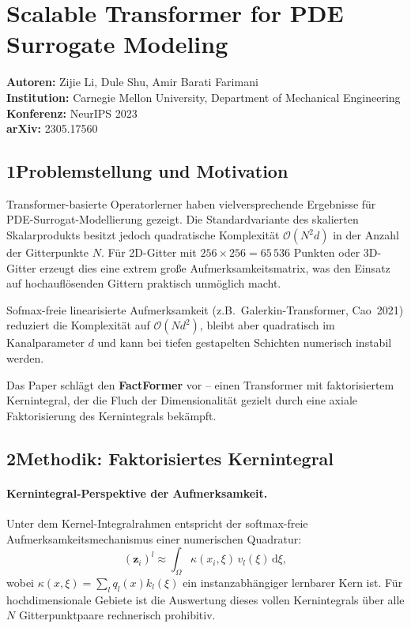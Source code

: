 \documentclass[a4paper,12pt]{article}
\begin{document}
\section*{Scalable Transformer for PDE Surrogate Modeling}

\textbf{Autoren:} Zijie Li, Dule Shu, Amir Barati Farimani \\
\textbf{Institution:} Carnegie Mellon University, Department of Mechanical Engineering \\
\textbf{Konferenz:} NeurIPS 2023 \\
\textbf{arXiv:} 2305.17560

\subsection*{1\quad Problemstellung und Motivation}

Transformer-basierte Operatorlerner haben vielversprechende Ergebnisse für PDE-Surrogat-Modellierung
gezeigt. Die Standardvariante des skalierten Skalarprodukts besitzt jedoch quadratische Komplexität
$\mathcal{O}(N^2 d)$ in der Anzahl der Gitterpunkte $N$. Für 2D-Gitter mit $256 \times 256 = 65\,536$
Punkten oder 3D-Gitter erzeugt dies eine extrem große Aufmerksamkeitsmatrix, was den
Einsatz auf hochauflösenden Gittern praktisch unmöglich macht.

Sofmax-freie linearisierte Aufmerksamkeit (z.B.\ Galerkin-Transformer, Cao~2021) reduziert
die Komplexität auf $\mathcal{O}(Nd^2)$, bleibt aber quadratisch im Kanalparameter $d$
und kann bei tiefen gestapelten Schichten numerisch instabil werden.

Das Paper schlägt den \textbf{FactFormer} vor -- einen Transformer mit faktorisiertem
Kernintegral, der die Fluch der Dimensionalität gezielt durch eine axiale Faktorisierung
des Kernintegrals bekämpft.

\subsection*{2\quad Methodik: Faktorisiertes Kernintegral}

\paragraph{Kernintegral-Perspektive der Aufmerksamkeit.}
Unter dem Kernel-Integralrahmen entspricht der softmax-freie Aufmerksamkeitsmechanismus
einer numerischen Quadratur:
\begin{equation}
    (\mathbf{z}_i)^l \approx \int_\Omega \kappa(x_i, \xi)\, v_l(\xi)\,\mathrm{d}\xi,
\end{equation}
wobei $\kappa(x, \xi) = \sum_l q_l(x) k_l(\xi)$ ein instanzabhängiger lernbarer Kern ist.
Für hochdimensionale Gebiete ist die Auswertung dieses vollen Kernintegrals über alle
$N$ Gitterpunktpaare rechnerisch prohibitiv.
\end{document}
